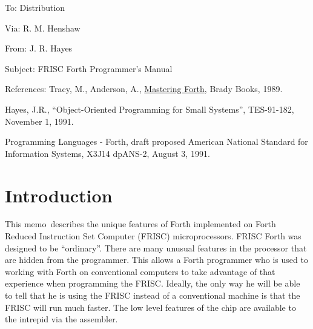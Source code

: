 \raggedbottom
\textwidth 6.5in
\oddsidemargin 0.0in
\evensidemargin 0.0in
\topmargin 0.0in
\textheight 9.0in

\pagestyle{fancy}
\newcommand{\memonum}{TES-92-45}
\newcommand{\issuedate}{February 27, 1992}
\lhead{}
\chead{}
\rhead{\memonum\\\ifnum\value{page}=1\issuedate\else Page \thepage\fi}
\lfoot{}
\cfoot{}
\rfoot{}
\addtolength{\headheight}{12pt}

\newcommand{\memoaddrlabel}[1]{\mbox{\bf #1}\hfil}
\newenvironment{memoaddress}{%
\begin{list}{}
	{
		\let\makelabel\memoaddrlabel
		\setlength{\labelwidth}{1in}
		\setlength{\leftmargin}{1in}
		\setlength{\labelsep}{0in}
		\setlength{\itemsep}{0in}
	}
}{%
\end{list}}

\newcommand{\doctype}{memo}			%

\newcommand{\namelistlabel}[1]{\mbox{#1:}\hfil}
\newenvironment{namelist}[1]{%
\begin{list}{}
   {
      \let\makelabel\namelistlabel
      \settowidth{\labelwidth}{#1}
      \setlength{\leftmargin}{1.1\labelwidth}
   }
}{%
\end{list}}


\begin{memoaddress}
	\item[To:] Distribution
	\item[Via:] R. M. Henshaw
	\item[From:] J. R. Hayes
	\item[Subject:] FRISC Forth Programmer's Manual
	\item[References:] Tracy, M., Anderson, A.,
	   \underline{Mastering Forth}, Brady Books, 1989.
	\item[] Hayes, J.R., ``Object-Oriented Programming for Small
	   Systems'', TES-91-182, November 1, 1991.
	\item[] Programming Languages - Forth, draft proposed
	   American National Standard for Information Systems,
	   X3J14 dpANS-2, August 3, 1991.
\end{memoaddress}

\newcommand{\fw}[1]{{\bf #1}}			%

\section{Introduction}
This \doctype\ describes the unique features of Forth implemented on
Forth Reduced Instruction Set Computer
(FRISC) microprocessors.  FRISC Forth was designed to be ``ordinary''.
There are many unusual features in the processor that are hidden from
the programmer.  This allows a Forth programmer who is used to working
with Forth on conventional computers to take advantage of that
experience when programming the FRISC.  Ideally, the only way he will be
able to tell that he is using the FRISC instead of a conventional machine
is that the FRISC will run much faster.  The low level features of the
chip are available to the intrepid via the assembler.

